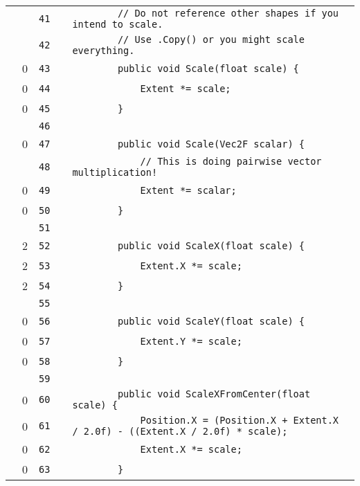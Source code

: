 \documentclass[a4paper,landscape,10pt]{article}
\begin{document}
\begin{longtable}[l]{lrrll}
\cellcolor{gray} &  & \verb~41~ & & \verb~        // Do not reference other shapes if you intend to scale.~\\
\cellcolor{gray} &  & \verb~42~ & & \verb~        // Use .Copy() or you might scale everything.~\\
\cellcolor{red} & 0 & \verb~43~ & & \verb~        public void Scale(float scale) {~\\
\cellcolor{red} & 0 & \verb~44~ & & \verb~            Extent *= scale;~\\
\cellcolor{red} & 0 & \verb~45~ & & \verb~        }~\\
\cellcolor{gray} &  & \verb~46~ & & \verb~~\\
\cellcolor{red} & 0 & \verb~47~ & & \verb~        public void Scale(Vec2F scalar) {~\\
\cellcolor{gray} &  & \verb~48~ & & \verb~            // This is doing pairwise vector multiplication!~\\
\cellcolor{red} & 0 & \verb~49~ & & \verb~            Extent *= scalar;~\\
\cellcolor{red} & 0 & \verb~50~ & & \verb~        }~\\
\cellcolor{gray} &  & \verb~51~ & & \verb~~\\
\cellcolor{green} & 2 & \verb~52~ & & \verb~        public void ScaleX(float scale) {~\\
\cellcolor{green} & 2 & \verb~53~ & & \verb~            Extent.X *= scale;~\\
\cellcolor{green} & 2 & \verb~54~ & & \verb~        }~\\
\cellcolor{gray} &  & \verb~55~ & & \verb~~\\
\cellcolor{red} & 0 & \verb~56~ & & \verb~        public void ScaleY(float scale) {~\\
\cellcolor{red} & 0 & \verb~57~ & & \verb~            Extent.Y *= scale;~\\
\cellcolor{red} & 0 & \verb~58~ & & \verb~        }~\\
\cellcolor{gray} &  & \verb~59~ & & \verb~~\\
\cellcolor{red} & 0 & \verb~60~ & & \verb~        public void ScaleXFromCenter(float scale) {~\\
\cellcolor{red} & 0 & \verb~61~ & & \verb~            Position.X = (Position.X + Extent.X / 2.0f) - ((Extent.X / 2.0f) * scale);~\\
\cellcolor{red} & 0 & \verb~62~ & & \verb~            Extent.X *= scale;~\\
\cellcolor{red} & 0 & \verb~63~ & & \verb~        }~\\

\end{longtable}
\end{document}
